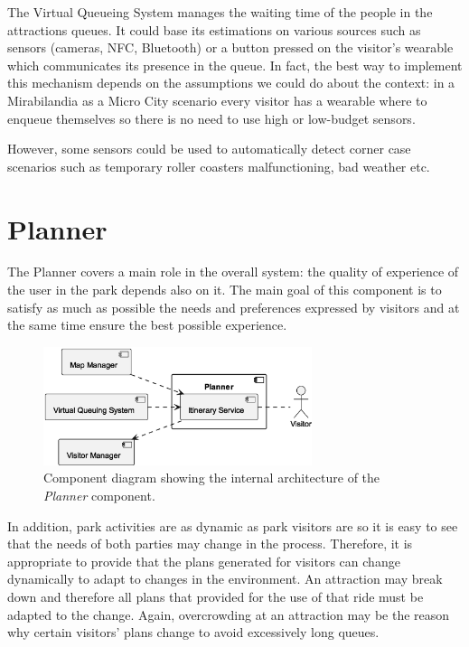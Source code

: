 The Virtual Queueing System manages the waiting time of the people in the attractions queues. It could base its estimations on various sources such
as sensors (cameras, NFC, Bluetooth) or a button pressed on the visitor's wearable which communicates its presence in the queue. In fact, the best
way to implement this mechanism depends on the assumptions we could do about the context: in a Mirabilandia as a Micro City scenario every visitor
has a wearable where to enqueue themselves so there is no need to use high or low-budget sensors.

However, some sensors could be used to automatically detect corner case scenarios such as temporary roller coasters malfunctioning, bad weather etc.

\section{Planner}\label{sec:planner}

The Planner covers a main role in the overall system: the quality of experience of the user in the park depends also on it. The main goal of this component is to satisfy as much as possible the needs and preferences expressed by visitors and at the same time ensure the best possible experience.

\begin{figure}[H]
	\centering
	\includegraphics[width=0.7\textwidth]{img/planner.eps}
	\caption{Component diagram showing the internal architecture of the \textit{Planner} component.}
	\label{fig:planner-arch}
\end{figure}

In addition, park activities are as dynamic as park visitors are so it is easy to see that the needs of both parties may change in the process.
Therefore, it is appropriate to provide that the plans generated for visitors can change dynamically to adapt to changes in the environment. An
attraction may break down and therefore all plans that provided for the use of that ride must be adapted to the change. Again, overcrowding at an
attraction may be the reason why certain visitors' plans change to avoid excessively long queues.

